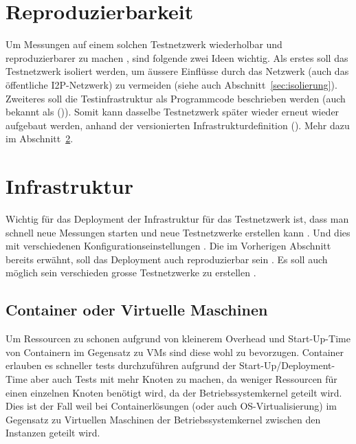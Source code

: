 

\section{Reproduzierbarkeit}

Um Messungen auf einem solchen Testnetzwerk wiederholbar und reproduzierbarer zu machen , sind folgende zwei Ideen wichtig.
Als erstes soll das Testnetzwerk isoliert werden, um äussere Einflüsse durch das Netzwerk (auch das öffentliche I2P-Netzwerk) zu vermeiden (siehe auch Abschnitt~\ref{sec:isolierung}).
Zweiteres soll die Testinfrastruktur als Programmcode beschrieben werden (auch bekannt als  ()).
Somit kann dasselbe Testnetzwerk später wieder erneut wieder aufgebaut werden, anhand der versionierten Infrastrukturdefinition (\glstext{}).
Mehr dazu im Abschnitt~\ref{sec:infrastructure}.

\section{Infrastruktur}\label{sec:infrastructure}

Wichtig für das Deployment der Infrastruktur für das Testnetzwerk ist, dass man schnell neue Messungen starten und neue Testnetzwerke erstellen kann .
Und dies mit verschiedenen Konfigurationseinstellungen .
Die im Vorherigen Abschnitt bereits erwähnt, soll das Deployment auch reproduzierbar sein .
Es soll auch möglich sein verschieden grosse Testnetzwerke zu erstellen .

\subsection{Container oder Virtuelle Maschinen}

Um Ressourcen zu schonen aufgrund von kleinerem Overhead und Start-Up-Time von Containern im Gegensatz zu VMs sind diese wohl zu bevorzugen.
Container erlauben es schneller tests durchzuführen  aufgrund der Start-Up/Deployment-Time
aber auch Tests mit mehr Knoten zu machen, da weniger Ressourcen für einen einzelnen Knoten benötigt wird, da der Betriebssystemkernel geteilt wird.
Dies ist der Fall weil bei Containerlösungen (oder auch OS-Virtualisierung) im Gegensatz zu Virtuellen Maschinen der Betriebssystemkernel zwischen den Instanzen geteilt wird.


